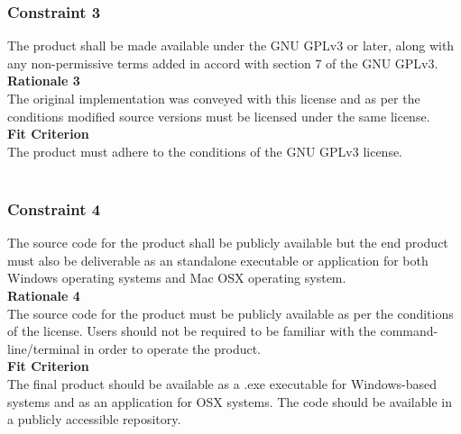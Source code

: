 \documentclass[12pt, titlepage]{article}
\begin{document}
		\subsubsection*{Constraint 3} \label {constraint3}
		\indent The product shall be made available under the GNU GPLv3 or 
		later, along with any non-permissive terms added in accord with section 
		7 of the GNU GPLv3.\\
		\textbf {Rationale 3}\\
		\indent The original implementation was conveyed with this license and 
		as per 
		the conditions modified source versions must be licensed under the same 
		license.\\
		\textbf {Fit Criterion}\\
		\indent The product must adhere to the conditions of the GNU GPLv3 
		license.\\\\
		
		\subsubsection*{Constraint 4} \label {constraint4}
		\indent The source code for the product shall be publicly available but 
		the end product must also be deliverable as an standalone executable or 
		application for both Windows operating systems and Mac OSX operating 
		system.\\
		\textbf {Rationale 4}\\
		\indent The source code for the product must be publicly available as 
		per the conditions of the license. Users should not be required to be 
		familiar with the command-line/terminal in order to operate the 
		product.\\
		\textbf {Fit Criterion}\\
		\indent The final product should be available as a .exe executable for 
		Windows-based systems and as an application for OSX systems. The code 
		should be available in a publicly accessible repository.\\
		
\end{document}
